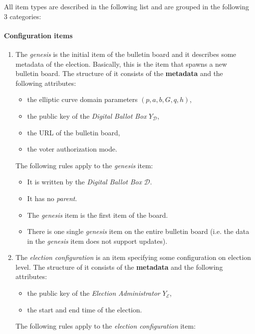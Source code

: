 All item types are described in the following list and are grouped in the following 3 categories:

\paragraph{Configuration items}
\begin{enumerate}
    \item 
        The \textit{genesis} is the initial item of the bulletin board and it describes some metadata of the election. Basically, this is the item that spawns a new bulletin board. The structure of it consists of the \textbf{metadata} and the following attributes:
        \begin{itemize}
            \item the elliptic curve domain parameters $(p, a, b, G, q, h)$,
            \item the public key of the \textit{Digital Ballot Box} $Y_\mathcal{D}$,
            \item the URL of the bulletin board,
            \item the voter authorization mode.
        \end{itemize}
        The following rules apply to the \textit{genesis} item:
        \begin{itemize}
            \item It is written by the \textit{Digital Ballot Box} $\mathcal{D}$.
            \item It has no \textit{parent}.
            \item The \textit{genesis} item is the first item of the board.
            \item There is one single \textit{genesis} item on the entire bulletin board (i.e. the data in the \textit{genesis} item does not support updates). 
        \end{itemize}
    \item
        The \textit{election configuration} is an item specifying some configuration on election level. The structure of it consists of the \textbf{metadata} and the following attributes:
        \begin{itemize}
            \item the public key of the \textit{Election Administrator} $Y_\mathcal{E}$,
            \item the start and end time of the election.
        \end{itemize}
        The following rules apply to the \textit{election configuration} item:

\end{enumerate}

